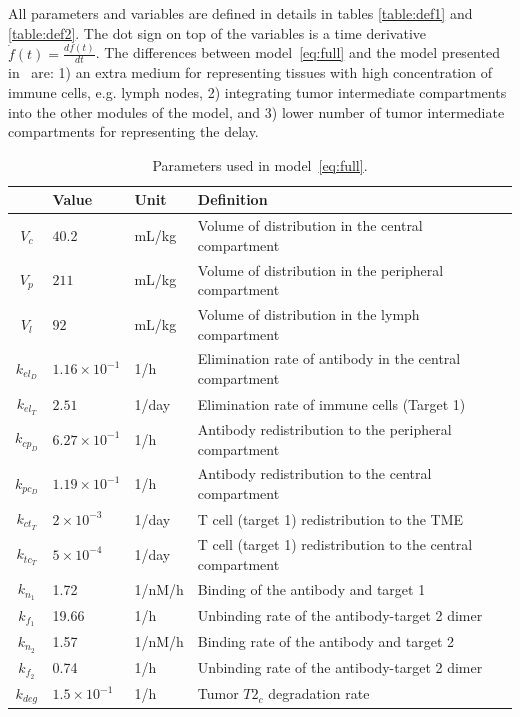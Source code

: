 All parameters and variables are defined in details in tables \ref{table:def1} and \ref{table:def2}. 
The dot sign on top of the variables is a time derivative $\dot{f}(t)=\frac{df(t)}{dt}$. 
The differences between model~\ref{eq:full} and the model presented in~\cite{betts2019translational} are: 1) an extra medium for representing tissues with high concentration of immune cells, e.g. lymph nodes, 2) integrating tumor intermediate compartments into the other modules of the model, and 3) lower number of tumor intermediate compartments for representing the delay.
%
\begin{landscape}
	\begin{table}[!ht]
		\centering
		\caption{Parameters used in model~\eqref{eq:full}.}
		\begin{tabular}{c l  l  l} 
			\hline
			& Value & Unit & Definition \\ [0.5ex] 
			\hline\hline
			$V_{c}$ & $40.2$ & mL/kg & Volume of distribution in the central compartment \\ 
			$V_{p}$ & $211$ & mL/kg & Volume of distribution in the peripheral compartment  \\ 
			$V_{l}$ & $92$ & mL/kg & Volume of distribution in the lymph compartment  \\ 
			$k_{el_D}$ & $1.16\times10^{-1}$ & 1/h & Elimination rate of antibody in the central compartment \\ 
			$k_{el_T}$ & $2.51$ & 1/day & Elimination rate of immune cells (Target 1)  \\ 
			$k_{cp_D}$ & $6.27\times10^{-1}$ & 1/h & Antibody redistribution to the peripheral compartment \\ 
			$k_{pc_D}$ & $1.19\times10^{-1}$ & 1/h & Antibody redistribution to the central compartment \\
			$k_{ct_T}$ & $2\times10^{-3}$ & 1/day & T cell (target 1) redistribution to the \ac{TME} \\ 
			$k_{tc_T}$ & $5\times10^{-4}$ & 1/day & T cell (target 1) redistribution to the central compartment\\ 
			$k_{n_1}$ & 1.72& 1/nM/h& Binding of the antibody and target 1 \\ 
			$k_{f_1}$ & 19.66& 1/h& Unbinding rate of the antibody-target 2 dimer \\ 
			$k_{n_2}$ & 1.57& 1/nM/h & Binding rate of the antibody and target 2 \\ 
			$k_{f_2}$ & 0.74 & 1/h & Unbinding rate of the antibody-target 2 dimer \\ 
			$k_{deg}$ & $1.5\times 10^{-1}$ & 1/h & Tumor $T2_c$ degradation rate \\

\end{tabular}
\end{table}
\end{landscape}
